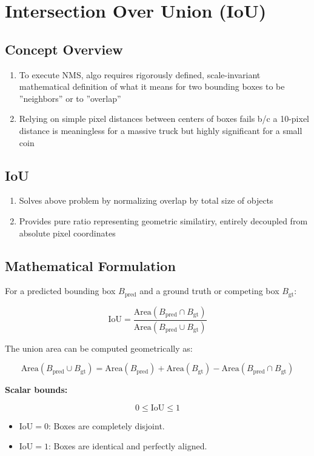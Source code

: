 \documentclass[12pt]{article}
\begin{document}
\section{Intersection Over Union (IoU)}

\subsection{Concept Overview}
\begin{enumerate}
    \item To execute NMS, algo requires rigorously defined, scale-invariant mathematical definition of what it means for two bounding boxes to be ''neighbors'' or to ''overlap''
    \item Relying on simple pixel distances between centers of boxes fails b/c a 10-pixel distance is meaningless for a massive truck but highly significant for a small coin
\end{enumerate}

\subsection{IoU}
\begin{enumerate}
    \item Solves above problem by normalizing overlap by total size of objects
    \item Provides pure ratio representing geometric similatiry, entirely decoupled from absolute pixel coordinates
\end{enumerate}

\subsection{Mathematical Formulation}

For a predicted bounding box $B_\text{pred}$ and a ground truth or competing box $B_\text{gt}$:

\[
    \text{IoU} = \frac{\text{Area}(B_\text{pred} \cap B_\text{gt})}{\text{Area}(B_\text{pred} \cup B_\text{gt})}
\]

The union area can be computed geometrically as:

\[
    \text{Area}(B_\text{pred} \cup B_\text{gt}) = \text{Area}(B_\text{pred}) + \text{Area}(B_\text{gt}) - \text{Area}(B_\text{pred} \cap B_\text{gt})
\]

\textbf{Scalar bounds:}

\[
    0 \leq \text{IoU} \leq 1
\]

\begin{itemize}
    \item $\text{IoU} = 0$: Boxes are completely disjoint.
    \item $\text{IoU} = 1$: Boxes are identical and perfectly aligned.
\end{itemize}
\end{document}
